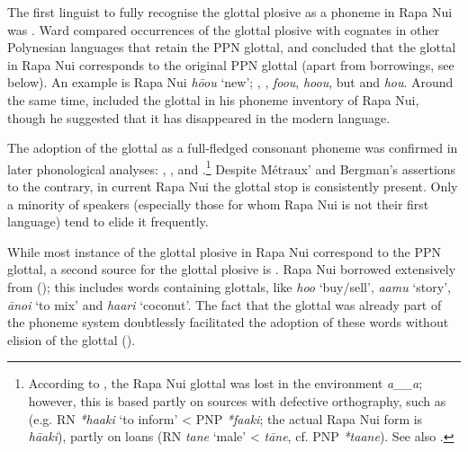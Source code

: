 The first linguist to fully recognise the glottal plosive as a phoneme in Rapa Nui was \citet{Ward1961,Ward1964}. Ward compared occurrences of the glottal plosive with cognates in other Polynesian languages that retain the PPN glottal, and concluded that the glottal in Rapa Nui corresponds to the original PPN glottal (apart from  borrowings, see below). An example is Rapa Nui \textit{hō{\ꞌ}ou} ‘new’; , ,  \textit{\mbox{fo{\ꞌ}ou}},  \textit{ho{\ꞌ}ou}, but  and  \textit{hou}. Around the same time, \citet[4]{Bergmann1963} included the glottal in his phoneme inventory of Rapa Nui, though he suggested that it has disappeared in the modern language.

The adoption of the glottal as a full-fledged consonant phoneme was confirmed in later phonological analyses: \citet{Blixen1972}, \citet{Salas1973}, \citet{WeberWeber1982} and \citet{GuerraEissmann1993}.\footnote{\label{fn:35}According to \citet[24, 69]{Marck2000}, the Rapa Nui glottal was lost in the environment \textit{a\_\_a}; however, this is based partly on sources with defective orthography, such as \citet{Fuentes1960} (e.g. RN \textit{*haaki} ‘to inform’ {\textless} PNP \textit{*fa{\ꞌ}aki}; the actual Rapa Nui form is \textit{hā{\ꞌ}aki}), partly on  loans (RN \textit{tane} ‘male’ {\textless}  \textit{tāne}, cf. PNP \textit{*ta{\ꞌ}ane}). See also \citet{Davletshin2015}.} Despite Métraux’ and Bergman’s assertions to the contrary, in current Rapa Nui the glottal stop is consistently present. Only a minority of speakers (especially those for whom Rapa Nui is not their first language) tend to elide it frequently. 

While most instance of the glottal plosive in Rapa Nui correspond to the PPN glottal, a second source for the glottal plosive is . Rapa Nui borrowed extensively from  (); this includes words containing glottals, like \textit{ho{\ꞌ}o} ‘buy/sell’, \textit{{\ꞌ}a{\ꞌ}amu} ‘story’, \textit{{\ꞌ}āno{\ꞌ}i} ‘to mix’ and \textit{ha{\ꞌ}ari} ‘coconut’. The fact that the glottal was already part of the phoneme system doubtlessly facilitated the adoption of these words without elision of the glottal ().

